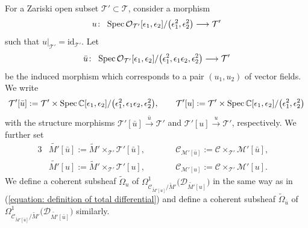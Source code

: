 \documentclass[pdftex]{sigma}
\numberwithin{equation}{section}
\newcommand\Spec{\mathop{\rm Spec}\nolimits}
\begin{document}
For a Zariski open subset
${\mathcal T'}\subset{\mathcal T}$,
consider a morphism
\begin{equation*}
 u\colon \ \Spec{\mathcal O}_{\mathcal T'}[\epsilon_1,\epsilon_2]/\big(\epsilon_1^2,\epsilon_2^2\big)
 \longrightarrow{\mathcal T'}
\end{equation*}
such that
$u|_{\mathcal T'}=\mathrm{id}_{\mathcal T'}$.
Let
\begin{equation*}
 \bar{u} \colon \ \Spec {\mathcal O}_{\mathcal T'}[\epsilon_1,\epsilon_2]
 /\big(\epsilon_1^2,\epsilon_1\epsilon_2,\epsilon_2^2\big)
 \longrightarrow {\mathcal T'}
\end{equation*}
be the induced morphism which corresponds to a pair
$(u_1,u_2)$ of vector fields.
We write
\[
 {\mathcal T'}[\bar{u}]:={\mathcal T}'\times
 \Spec\mathbb{C}[\epsilon_1,\epsilon_2]/\big(\epsilon_1^2,\epsilon_1\epsilon_2,\epsilon_2^2\big),
 \qquad
 {\mathcal T'}[u]:={\mathcal T}'\times
 \Spec\mathbb{C}[\epsilon_1,\epsilon_2]/\big(\epsilon_1^2,\epsilon_2^2\big)
\]
with the structure morphisms
${\mathcal T'}[\bar{u}]\xrightarrow{\bar{u}}{\mathcal T'}$
and
${\mathcal T'}[u]\xrightarrow{u}{\mathcal T'}$,
respectively.
We further set
\begin{alignat*}{3}
& \tilde{M'}[\bar{u}]
:=\tilde{M}'\times_{\mathcal T'}{\mathcal T'}[\bar{u}] ,\qquad &&
 {\mathcal C}_{ {\mathcal M'}[\bar{u}] }
 :=
 {\mathcal C}\times_{\mathcal T'} {\mathcal M'}[\bar{u}],&
 \\
& \tilde{M'}[u]
 :=
 \tilde{M}'\times_{\mathcal T'}{\mathcal T'}[u],
 \qquad&&
 {\mathcal C}_{ {\mathcal M'}[u] }
 :=
 {\mathcal C}\times_{\mathcal T'} {\mathcal M'}[u].&
\end{alignat*}
We define a coherent subsheaf
$\tilde{\Omega}_u$ of
$\Omega^1_{{\mathcal C}_{\tilde{M}'[u]}/\tilde{M}'}\big({\mathcal D}_{\tilde{M'}[u]}\big)$
in the same way as in (\ref{equation: definition of total differential})
and define a coherent subsheaf
$\tilde{\Omega}_{\bar{u}}$ of
$\Omega^1_{{\mathcal C}_{\tilde{M}'[\bar{u}]}/\tilde{M}'}\big({\mathcal D}_{\tilde{M'}[\bar{u}]}\big)$
similarly.
\end{document}
